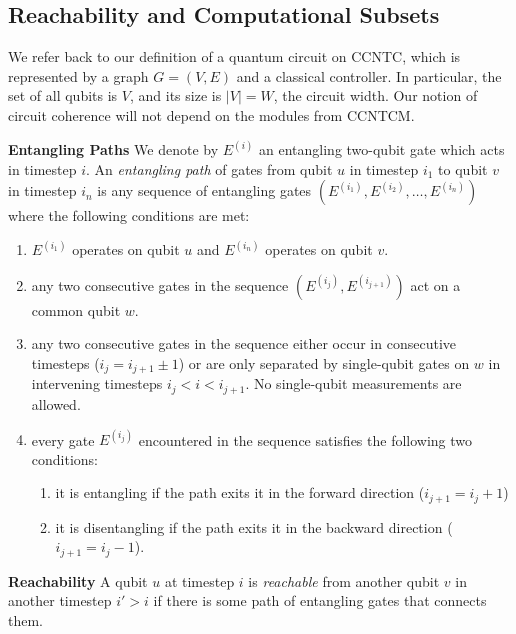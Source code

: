 \subsection{Reachability and Computational Subsets}
\label{subsec:cohere-subset}

We refer back to our definition of a quantum circuit on
\textsf{CCNTC}, which is represented by a graph $G = (V,E)$ and a
classical controller. In particular, the set of all qubits is $V$,
and its size is $|V|=W$, the circuit width.
Our notion of circuit coherence will not depend
on the modules from \textsc{CCNTCM}.

\begin{definition}{\textbf{Entangling Paths}}
We denote by $E^{(i)}$ an entangling two-qubit gate which acts in
timestep $i$.
An \emph{entangling path} of gates from qubit $u$ in timestep $i_1$ to
qubit $v$ in timestep $i_n$ is
any sequence of entangling gates $(E^{(i_1)}, E^{(i_2)}, \ldots, E^{(i_n)})$
where the following conditions are met:

\begin{enumerate}
\item
$E^{(i_1)}$ operates on qubit $u$ and $E^{(i_n)}$ operates on qubit $v$.

\item
any two consecutive gates in the sequence $(E^{(i_j)},E^{(i_{j+1})})$
act on a common qubit $w$.
\item
any two consecutive gates in the sequence either occur in
consecutive timesteps ($i_j = i_{j+1} \pm 1$) or are only separated by
single-qubit gates on $w$ in intervening timesteps $i_j < i < i_{j+1}$.
No single-qubit measurements are allowed.
\item
every gate $E^{(i_j)}$ encountered in the sequence satisfies the
following two conditions:

\begin{enumerate}
\item it is entangling if
the path exits it in the forward direction ($i_{j+1} = i_j + 1$)
\item it is disentangling if the path exits it in the backward direction
($i_{j+1} = i_j - 1$).
\end{enumerate}
\end{enumerate}

\end{definition}

\begin{definition}{\textbf{Reachability}}
A qubit $u$ at timestep $i$ is \emph{reachable} from another qubit $v$ in
another timestep $i' > i$ if there is some path of entangling gates that
connects them.
\end{definition}

